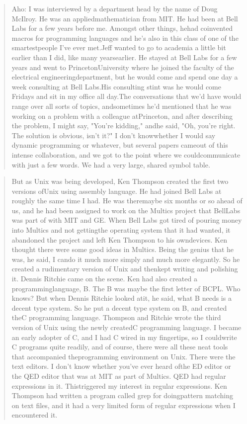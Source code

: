 \begin{quotation}
Aho: I was interviewed by a department head by the name of Doug McIlroy. He was an appliedmathematician from MIT. He had been at Bell Labs for a few years before me. Amongst other things, hehad coinvented macros for programming languages and he's also in this class of one of the smartestpeople I've ever met.Jeff wanted to go to academia a little bit earlier than I did, like many yearsearlier. He stayed at Bell Labs for a few years and went to PrincetonUniversity where he joined the faculty of the electrical engineeringdepartment, but he would come and spend one day a week consulting at Bell Labs.His consulting stint was he would come Fridays and sit in my office all day.The conversations that we'd have would range over all sorts of topics, andsometimes he'd mentioned that he was working on a problem with a colleague atPrinceton, and after describing the problem, I might say, "You're kidding," andhe said, "Oh, you're right. The solution is obvious, isn't it?" I don't knowwhether I would say dynamic programming or whatever, but several papers cameout of this intense collaboration, and we got to the point where we couldcommunicate with just a few words. We had a very large, shared symbol table.
\cite{aho_oral_history_2022}
\end{quotation}
\begin{quotation}
    But as Unix was being developed, Ken Thompson created the first two versions ofUnix using assembly language. He had joined Bell Labs at roughly the same time I had. He was theremaybe six months or so ahead of us, and he had been assigned to work on the Multics project that BellLabs was part of with MIT and GE. When Bell Labs got tired of pouring money into Multics and not gettingthe operating system that it had wanted, it abandoned the project and left Ken Thompson to his owndevices. Ken thought there were some good ideas in Multics. Being the genius that he was, he said, I cando it much more simply and much more elegantly. So he created a rudimentary version of Unix and thenkept writing and polishing it. Dennis Ritchie came on the scene. Ken had also created a programminglanguage, B. The B was maybe the first letter of BCPL. Who knows? But when Dennis Ritchie looked atit, he said, what B needs is a decent type system. So he put a decent type system on B, and created theC programming language. Thompson and Ritchie wrote the third version of Unix using the newly createdC programming language. I became an early adopter of C, and I had C wired in my fingertips, so I couldwrite C programs quite readily, and of course, there were all these neat tools that accompanied theprogramming environment on Unix. There were the text editors. I don't know whether you've ever heard ofthe ED editor or the QED editor that was at MIT as part of Multics. QED had regular expressions in it. Thistriggered my interest in regular expressions. Ken Thompson had written a program called grep for doingpattern matching on text files, and it had a very limited form of regular expressions when I encountered it.
\cite{aho_oral_history_2022}
\end{quotation}
